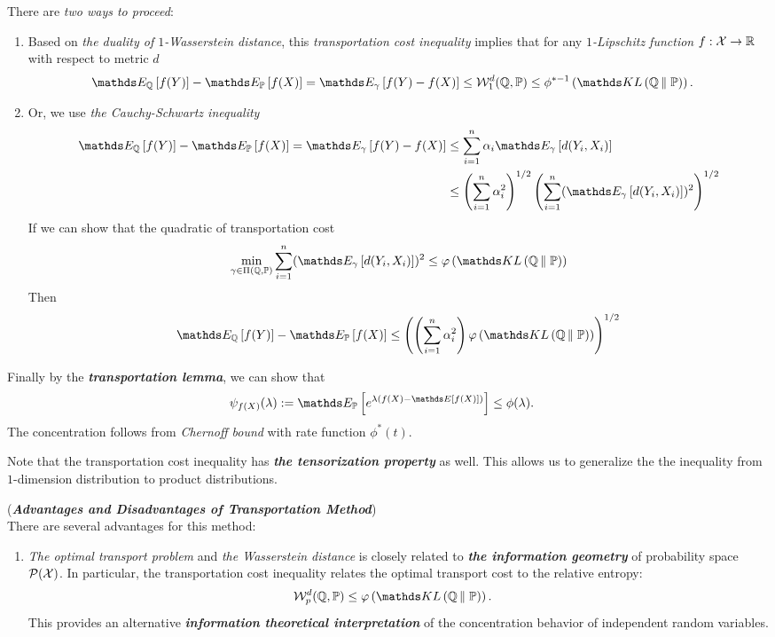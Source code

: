 \documentclass[11pt]{article}
\begin{document}
\begin{enumerate}
There are \emph{two ways to proceed}:
\begin{enumerate}
\item Based on \emph{the duality of $1$-Wasserstein distance}, this \emph{transportation cost inequality} implies that for any \emph{$1$-Lipschitz function} $f: {\mathcal X} \to {\mathbb R}$ with respect to metric $d$
\begin{align*}
\E{\bQ}{f(Y)} - \E{\bP}{f(X)} = \E{\gamma}{f(Y) - f(X)} &\le \cW_{1}^{d}(\bQ, \bP)  \le \phi^{*-1}\paren{\kl{\bQ}{\bP}}.
\end{align*} 

\item Or, we use \emph{the Cauchy-Schwartz inequality}
\begin{align*}
\E{\bQ}{f(Y)} - \E{\bP}{f(X)} = \E{\gamma}{f(Y) - f(X)} &\le \sum_{i=1}^{n}\alpha_i \E{\gamma}{d(Y_i, X_i)}\\
&\le \paren{\sum_{i=1}^{n}\alpha_i^2}^{1/2}\paren{ \sum_{i=1}^{n} (\E{\gamma}{d(Y_i, X_i)})^2}^{1/2}
\end{align*} If we can show that the quadratic of transportation cost
\begin{align*}
 \min_{\gamma \in \Pi(\bQ, \bP)} \sum_{i=1}^{n}(\E{\gamma}{d(Y_i, X_i)})^2 \le \varphi\paren{\kl{\bQ}{\bP}}
\end{align*} Then
\begin{align*}
\E{\bQ}{f(Y)} - \E{\bP}{f(X)} \le \paren{ \paren{\sum_{i=1}^{n}\alpha_i^2}\varphi\paren{\kl{\bQ}{\bP}}}^{1/2}
\end{align*}
\end{enumerate}

Finally by the \emph{\textbf{transportation lemma}}, we can show that 
\begin{align*}
\psi_{f(X)}(\lambda) := \E{\bP}{e^{\lambda (f(X) - \E{}{f(X)})}} &\le \phi(\lambda).
\end{align*} The concentration follows from \emph{Chernoff bound} with rate function $\phi^{*}(t)$.

Note that the transportation cost inequality has \emph{\textbf{the tensorization property}} as well. This allows us to generalize the the inequality from $1$-dimension distribution to product distributions.

\begin{remark} (\textbf{\emph{Advantages and Disadvantages of  Transportation Method}})\\
There are several advantages for this method:
\begin{enumerate}
\item \emph{The optimal transport problem} and \emph{the Wasserstein distance} is closely related to \emph{\textbf{the information geometry}} of probability space ${\mathcal P}({\mathcal X})$. In particular, the transportation cost inequality relates the optimal transport cost to the relative entropy:
\begin{align*}
\cW_{p}^{d}(\bQ, \bP) &\le \varphi\paren{\kl{\bQ}{\bP}}.
\end{align*} This provides an alternative \emph{\textbf{information theoretical interpretation}} of the concentration behavior of independent random variables.


\end{enumerate}
\end{remark}
\end{enumerate}
\end{document}
